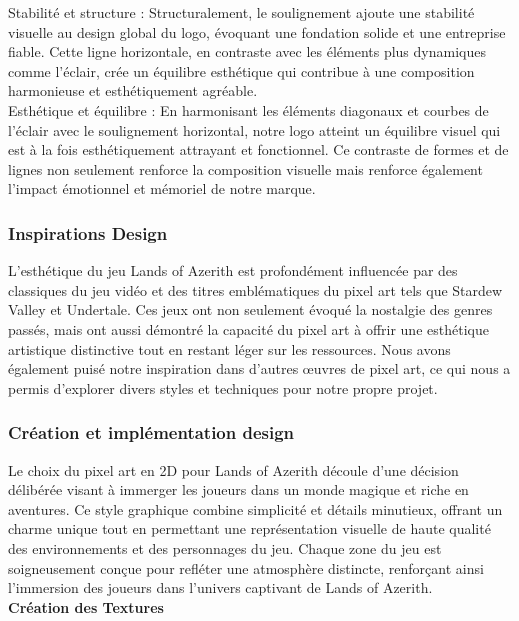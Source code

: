 Stabilité et structure : Structuralement, le soulignement ajoute une stabilité visuelle au design global du logo, évoquant une fondation solide et une entreprise fiable. Cette ligne horizontale, en contraste avec les éléments plus dynamiques comme l'éclair, crée un équilibre esthétique qui contribue à une composition harmonieuse et esthétiquement agréable. 
\\

Esthétique et équilibre : En harmonisant les éléments diagonaux et courbes de l'éclair avec le soulignement horizontal, notre logo atteint un équilibre visuel qui est à la fois esthétiquement attrayant et fonctionnel. Ce contraste de formes et de lignes non seulement renforce la composition visuelle mais renforce également l'impact émotionnel et mémoriel de notre marque. 


\subsubsection{Inspirations Design}

L'esthétique du jeu Lands of Azerith est profondément influencée par des classiques du jeu vidéo et des titres emblématiques du pixel art tels que Stardew Valley et Undertale. 
Ces jeux ont non seulement évoqué la nostalgie des genres passés, mais ont aussi démontré la capacité du pixel art à offrir une esthétique artistique distinctive tout en restant léger sur les ressources. 
Nous avons également puisé notre inspiration dans d'autres œuvres de pixel art, ce qui nous a permis d'explorer divers styles et techniques pour notre propre projet.

\subsubsection{Création et implémentation design}

Le choix du pixel art en 2D pour Lands of Azerith découle d'une décision délibérée visant à immerger les joueurs dans un monde magique et riche en aventures. Ce style graphique combine simplicité et détails minutieux, offrant un charme unique tout en permettant une représentation visuelle de haute qualité des environnements et des personnages du jeu. Chaque zone du jeu est soigneusement conçue pour refléter une atmosphère distincte, renforçant ainsi l'immersion des joueurs dans l'univers captivant de Lands of Azerith. 
\\

\textbf{Création des Textures}
\\

